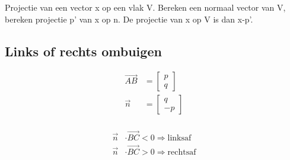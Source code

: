\documentclass[a4paper, twocolumn]{article}
\renewcommand{\vec}{\overrightarrow}
\begin{document}
Projectie van een vector x op een vlak V. Bereken een normaal vector van V, bereken projectie p' van x op n. De projectie van x op V is dan x-p'.\\


\subsection*{Links of rechts ombuigen}\vspace{-0.5em}
\begin{minipage}{0.45\linewidth}
\end{minipage}
\begin{minipage}{0.25\linewidth}
	\begin{align*}
	\vec{AB} &= \begin{bmatrix} p \\ q \end{bmatrix} \\
	\vec{n} &= \begin{bmatrix} q \\ -p \end{bmatrix} \\
	\end{align*}
\end{minipage}%
\begin{minipage}{0.25\linewidth}
	\begin{align*}
	\vec{n} &\cdot \vec{BC} < 0 \Rightarrow \text{linksaf} \\
	\vec{n} &\cdot \vec{BC} > 0 \Rightarrow \text{rechtsaf}
	\end{align*}
\end{minipage}
\end{document}
